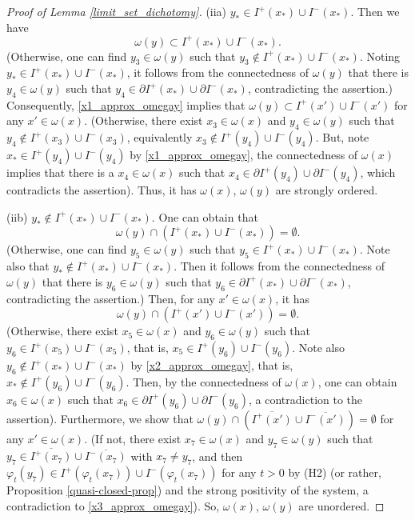 \documentclass[a4paper,11pt]{article}
\theoremstyle{plain}
\theoremstyle{definition}
\numberwithin{equation}{section}
\begin{document}
\begin{proof}[Proof of Lemma \ref{limit_set_dichotomy}]
	(iia) $y_*\in I^{+}(x_*)\cup I^{-}(x_*)$. Then we have
	\begin{equation}\label{x1_approx_omegay}
		\omega(y)\subset I^{+}(x_*)\cup I^{-}(x_*).
	\end{equation}
	(Otherwise, one can find $y_3\in\omega(y)$ such that $y_3\notin I^{+}(x_*)\cup I^{-}(x_*)$. Noting $y_*\in I^{+}(x_*)\cup I^{-}(x_*)$, it follows from the connectedness of $\omega(y)$ that there is $y_4\in\omega(y)$ such that $y_4\in\partial I^{+}(x_*)\cup \partial I^{-}(x_*)$, contradicting the assertion.)
	Consequently, \eqref{x1_approx_omegay} implies that $\omega(y)\subset I^{+}(x')\cup I^{-}(x')$ for any $x'\in \omega(x)$.
	(Otherwise, there exist $x_3\in\omega(x)$ and $y_4\in\omega(y)$ such that $y_4\notin I^{+}(x_3)\cup I^{-}(x_3)$, equivalently $x_3\notin I^{+}(y_4)\cup I^{-}(y_4)$. But, note $x_*\in I^{+}(y_4)\cup I^{-}(y_4)$ by \eqref{x1_approx_omegay}, the connectedness of $\omega(x)$ implies that there is a $x_4\in\omega(x)$ such that $x_4\in \partial I^{+}(y_4)\cup \partial I^{-}(y_4)$, which contradicts the assertion). Thus, it has $\omega(x)$, $\omega(y)$ are strongly ordered.
		
	(iib) $y_*\notin I^{+}(x_*)\cup I^{-}(x_*)$. One can obtain that 
    \begin{equation}\label{x2_approx_omegay}
		\omega(y)\cap (I^{+}(x_*)\cup I^{-}(x_*))=\emptyset.
	\end{equation}
    (Otherwise, one can find $y_5\in\omega(y)$ such that $y_5\in I^{+}(x_*)\cup I^{-}(x_*)$. Note also that $y_*\notin I^{+}(x_*)\cup I^{-}(x_*)$. Then it follows from the connectedness of $\omega(y)$ that there is $y_6\in\omega(y)$ such that $y_6\in \partial I^{+}(x_*)\cup \partial I^{-}(x_*)$, contradicting the assertion.) 
    Then, for any $x'\in\omega(x)$, it has 
    \begin{equation}\label{x3_approx_omegay}
        \omega(y)\cap (I^{+}(x')\cup I^{-}(x'))=\emptyset.
    \end{equation} (Otherwise, there exist $x_5\in\omega(x)$ and $y_6\in\omega(y)$ such that $y_6\in I^{+}(x_5)\cup I^{-}(x_5)$, that is, $x_5\in I^{+}(y_6)\cup I^{-}(y_6)$. Note also $y_6\notin I^{+}(x_*)\cup I^{-}(x_*)$ by \eqref{x2_approx_omegay}, that is, $x_*\notin I^{+}(y_6)\cup I^{-}(y_6)$. 
    Then, by the connectedness of $\omega(x)$, one can obtain $x_6\in\omega(x)$ such that $x_6\in \partial I^{+}(y_6)\cup \partial I^{-}(y_6)$, a contradiction to the assertion). Furthermore, we show that $\omega(y)\cap (\overline{I^{+}(x')}\cup \overline{I^{-}(x')})=\emptyset$ for any $x'\in\omega(x)$. (If not, there exist $x_7\in\omega(x)$ and $y_7\in\omega(y)$ such that $y_7\in \overline{I^{+}(x_7)}\cup \overline{I^{-}(x_7)}$ with $x_7\neq y_7$, and then $\varphi_t(y_7)\in I^{+}(\varphi_t(x_7))\cup I^{-}(\varphi_t(x_7))$ for any $t>0$ by (H2) (or rather, Proposition \ref{quasi-closed-prop}) and the strong positivity of the system, a contradiction to \eqref{x3_approx_omegay}). So, $\omega(x)$, $\omega(y)$ are unordered.
    

\end{proof}
\end{document}
